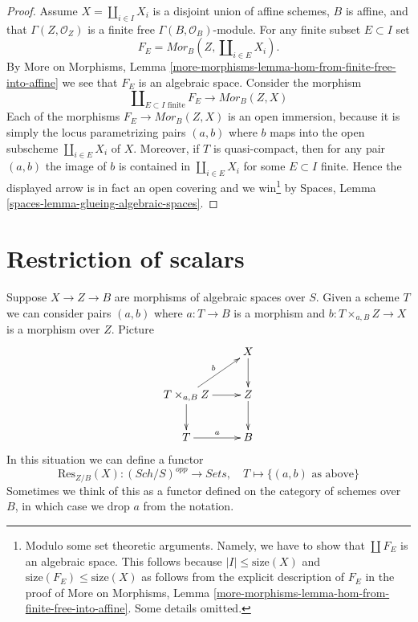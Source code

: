 \documentclass{stacks-project}
\theoremstyle{plain}
\theoremstyle{definition}
\theoremstyle{remark}
\numberwithin{equation}{subsection}
\def\Sch{\mathit{Sch}}
\begin{document}
\begin{proof}
\medskip\noindent
Assume $X = \coprod_{i \in I} X_i$ is a disjoint union of affine
schemes, $B$ is affine, and that $\Gamma(Z, \mathcal{O}_Z)$ is a finite
free $\Gamma(B, \mathcal{O}_B)$-module. For any finite subset
$E \subset I$ set
$$
F_E = \mathit{Mor}_B(Z, \coprod\nolimits_{i \in E} X_i).
$$
By More on Morphisms,
Lemma \ref{more-morphisms-lemma-hom-from-finite-free-into-affine}
we see that $F_E$ is an algebraic space. Consider the morphism
$$
\coprod\nolimits_{E \subset I\text{ finite}} F_E
\longrightarrow
\mathit{Mor}_B(Z, X)
$$
Each of the morphisms
$F_E \to \mathit{Mor}_B(Z, X)$ is an open immersion, because it is
simply the locus parametrizing pairs $(a, b)$ where $b$ maps into
the open subscheme $\coprod\nolimits_{i \in E} X_i$ of $X$. Moreover,
if $T$ is quasi-compact, then for any pair $(a, b)$ the image
of $b$ is contained in $\coprod\nolimits_{i \in E} X_i$ for some
$E \subset I$ finite. Hence the displayed arrow is in fact an
open covering and we win\footnote{Modulo
some set theoretic arguments. Namely, we have to show that
$\coprod F_E$ is an algebraic space. This follows because
$|I| \leq \text{size}(X)$ and $\text{size}(F_E) \leq \text{size}(X)$
as follows from the explicit description of $F_E$ in the proof of
More on Morphisms,
Lemma \ref{more-morphisms-lemma-hom-from-finite-free-into-affine}.
Some details omitted.} by
Spaces, Lemma \ref{spaces-lemma-glueing-algebraic-spaces}.
\end{proof}










\section{Restriction of scalars}
\label{section-restriction-of-scalars}

\noindent
Suppose $X \to Z \to B$ are morphisms of algebraic spaces over $S$.
Given a scheme $T$ we can consider pairs $(a, b)$ where $a : T \to B$
is a morphism and $b : T \times_{a, B} Z \to X$ is a morphism over $Z$.
Picture
\begin{equation}
\label{equation-pairs}
\vcenter{
\xymatrix{
& X \ar[d] \\
T \times_{a, B} Z \ar[d] \ar[ru]^b \ar[r] & Z \ar[d] \\
T \ar[r]^a & B
}
}
\end{equation}
In this situation we can define a
functor
\begin{equation}
\label{equation-restriction-of-scalars}
\text{Res}_{Z/B}(X) : (\Sch/S)^{opp} \longrightarrow \textit{Sets},
\quad
T \longmapsto \{(a, b)\text{ as above}\}
\end{equation}
Sometimes we think of this as a functor defined on the category
of schemes over $B$, in which case we drop $a$ from the notation.
\end{document}
